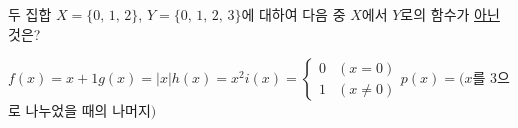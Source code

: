 두 집합 $X=\{0,\,1,\,2\}$, $Y=\{0,\,1,\,2,\,3\}$에 대하여 다음 중 $X$에서 $Y$로의 함수가 \underline{아닌} 것은?
\begin{choicesii}{$f(x)=x+1$}{$g(x)=|x|$}{$h(x)=x^2$}{$i(x)=\begin{cases} 0 & (x=0) \\ 1 & (x\ne 0) \end{cases}$}{$p(x)=(x$를 $3$으로 나누었을 때의 나머지$)$}\end{choicesii}
